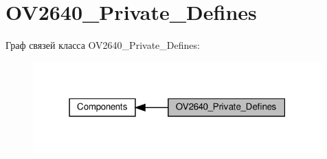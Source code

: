 \hypertarget{group___o_v2640___private___defines}{}\section{O\+V2640\+\_\+\+Private\+\_\+\+Defines}
\label{group___o_v2640___private___defines}
Граф связей класса O\+V2640\+\_\+\+Private\+\_\+\+Defines\+:
\nopagebreak
\begin{figure}[H]
\begin{center}
\leavevmode
\includegraphics[width=315pt]{group___o_v2640___private___defines}
\end{center}
\end{figure}
